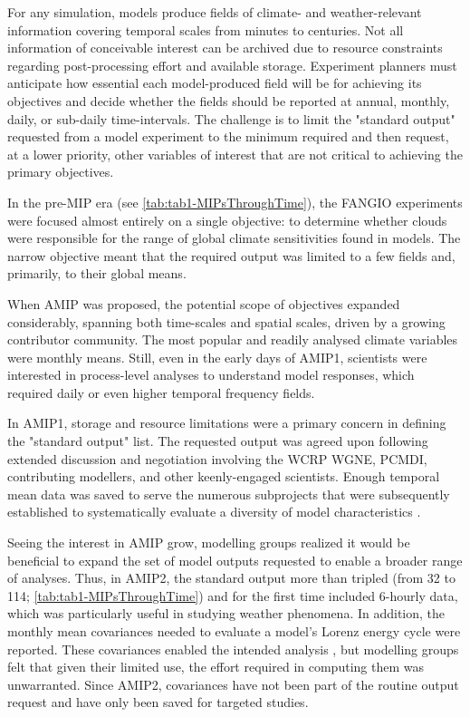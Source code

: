 \documentclass[manuscript]{copernicus}
\begin{document}
For any simulation, models produce fields of climate- and weather-relevant information covering temporal scales from minutes to centuries. Not all information of conceivable interest can be archived due to resource constraints regarding post-processing effort and available storage. Experiment planners must anticipate how essential each model-produced field will be for achieving its objectives and decide whether the fields should be reported at annual, monthly, daily, or sub-daily time-intervals. The challenge is to limit the "standard output" requested from a model experiment to the minimum required and then request, at a lower priority, other variables of interest that are not critical to achieving the primary objectives.

In the pre-MIP era (see \autoref{tab:tab1-MIPsThroughTime}), the FANGIO experiments were focused almost entirely on a single objective: to determine whether clouds were responsible for the range of global climate sensitivities found in models. The narrow objective meant that the required output was limited to a few fields and, primarily, to their global means.

When AMIP was proposed, the potential scope of objectives expanded considerably, spanning both time-scales and spatial scales, driven by a growing contributor community. The most popular and readily analysed climate variables were monthly means. Still, even in the early days of AMIP1, scientists were interested in process-level analyses to understand model responses, which required daily or even higher temporal frequency fields.

In AMIP1, storage and resource limitations were a primary concern in defining the "standard output" list. The requested output was agreed upon following extended discussion and negotiation involving the WCRP WGNE, PCMDI, contributing modellers, and other keenly-engaged scientists. Enough temporal mean data was saved to serve the numerous subprojects that were subsequently established to systematically evaluate a diversity of model characteristics \citep{gates_amip_1995}. 

Seeing the interest in AMIP grow, modelling groups realized it would be beneficial to expand the set of model outputs requested to enable a broader range of analyses. Thus, in AMIP2, the standard output more than tripled (from 32 to 114; \autoref{tab:tab1-MIPsThroughTime}) and for the first time included 6-hourly data, which was particularly useful in studying weather phenomena. In addition, the monthly mean covariances needed to evaluate a model's Lorenz energy cycle were reported. These covariances enabled the intended analysis \citep{boer_energy_2008}, but modelling groups felt that given their limited use, the effort required in computing them was unwarranted. Since AMIP2, covariances have not been part of the routine output request and have only been saved for targeted studies.
\end{document}
